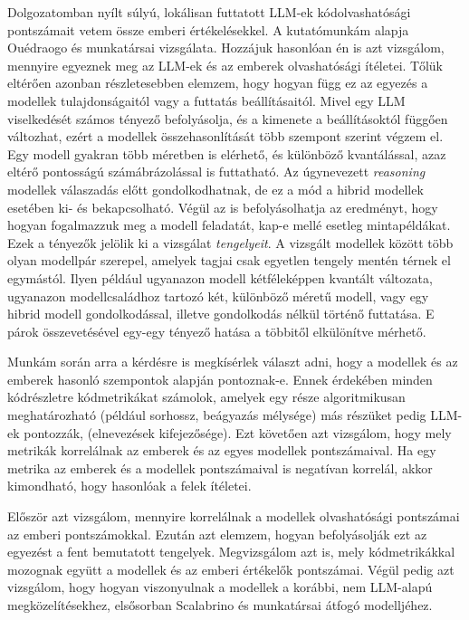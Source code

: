 \documentclass[
]{elteikthesis}[2024/04/26]
\begin{document}
Dolgozatomban nyílt súlyú, lokálisan futtatott
LLM-ek kódolvashatósági pontszámait vetem össze emberi értékelésekkel. A
kutatómunkám alapja Ouédraogo és munkatársai vizsgálata.
Hozzájuk hasonlóan én is azt vizsgálom, mennyire egyeznek meg az LLM-ek és az
emberek olvashatósági ítéletei. Tőlük eltérően azonban részletesebben elemzem,
hogy hogyan függ ez az egyezés a modellek tulajdonságaitól vagy a futtatás
beállításaitól. Mivel egy LLM viselkedését számos tényező befolyásolja, és a
kimenete a beállításoktól függően változhat, ezért a modellek összehasonlítását
több szempont szerint végzem el. Egy modell gyakran több méretben is elérhető,
és különböző kvantálással, azaz eltérő pontosságú számábrázolással is
futtatható. Az úgynevezett \textit{reasoning} modellek válaszadás előtt
gondolkodhatnak, de ez a mód a hibrid modellek esetében ki- és bekapcsolható.
Végül az is befolyásolhatja az eredményt, hogy hogyan fogalmazzuk meg a modell
feladatát, kap-e mellé esetleg mintapéldákat. Ezek a tényezők jelölik ki a
vizsgálat \textit{tengelyeit}. A vizsgált modellek között több olyan modellpár
szerepel, amelyek tagjai csak egyetlen tengely mentén térnek el egymástól. Ilyen
például ugyanazon modell kétféleképpen kvantált változata, ugyanazon
modellcsaládhoz tartozó két, különböző méretű modell, vagy egy hibrid modell
gondolkodással, illetve gondolkodás nélkül történő futtatása. E párok
összevetésével egy-egy tényező hatása a többitől elkülönítve mérhető.

Munkám során arra a kérdésre is megkísérlek választ adni,
hogy a modellek és az emberek hasonló szempontok alapján
pontoznak-e. Ennek érdekében minden kódrészletre kódmetrikákat számolok, amelyek
egy része algoritmikusan
meghatározható (például sorhossz, beágyazás mélysége)
más részüket pedig LLM-ek pontozzák, (elnevezések kifejezősége). Ezt követően
azt vizsgálom, %
hogy mely metrikák korrelálnak az emberek és az egyes modellek pontszámaival. Ha
egy metrika az emberek és a modellek pontszámaival is negatívan korrelál, akkor
kimondható, hogy hasonlóak a felek ítéletei. %

Először azt vizsgálom, mennyire korrelálnak a modellek olvashatósági pontszámai az emberi
pontszámokkal. Ezután azt elemzem, hogyan befolyásolják ezt az egyezést a fent
bemutatott tengelyek. Megvizsgálom azt is, mely kódmetrikákkal mozognak együtt a
modellek és az emberi értékelők pontszámai. Végül pedig azt vizsgálom, hogy
hogyan viszonyulnak a modellek a korábbi, nem LLM-alapú megközelítésekhez,
elsősorban Scalabrino és munkatársai átfogó modelljéhez.
\end{document}
